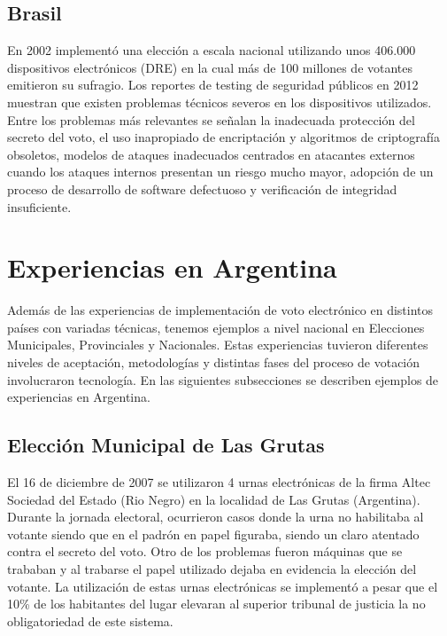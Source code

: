 \subsection{Brasil}
En 2002 implementó una elección a escala nacional utilizando unos 406.000 dispositivos electrónicos (DRE) en la cual más de 100 millones de votantes emitieron su sufragio. Los reportes de testing de seguridad públicos en 2012 muestran que existen problemas técnicos severos en los dispositivos utilizados. Entre los problemas más relevantes se señalan la inadecuada protección del secreto del voto, el uso inapropiado de encriptación y algoritmos de criptografía obsoletos, modelos de ataques inadecuados centrados en atacantes externos cuando los ataques internos presentan un riesgo mucho mayor, adopción de un proceso de desarrollo de software defectuoso y verificación de integridad insuficiente.\cite{brunazo2005voto}

\section{Experiencias en Argentina}
Además de las experiencias de implementación de voto electrónico en distintos países con variadas técnicas, tenemos ejemplos a nivel nacional en Elecciones Municipales, Provinciales y Nacionales. Estas experiencias tuvieron diferentes niveles de aceptación, metodologías y distintas fases del proceso de votación involucraron tecnología. En las siguientes subsecciones se describen ejemplos de experiencias en Argentina.

\subsection{Elección Municipal de Las Grutas}
El 16 de diciembre de 2007 se utilizaron 4 urnas electrónicas de la firma Altec Sociedad del Estado (Rio Negro) en la localidad de Las Grutas (Argentina). Durante la jornada electoral, ocurrieron casos donde la urna no habilitaba al votante siendo que en el padrón en papel figuraba, siendo un claro atentado contra el secreto del voto. Otro de los problemas fueron máquinas que se trababan y al trabarse el papel utilizado dejaba en evidencia la elección del votante. La utilización de estas urnas electrónicas se implementó a pesar que el 10\% de los habitantes del lugar elevaran al superior tribunal de justicia la no obligatoriedad de este sistema. \cite{eleccionesLasGrutas}
